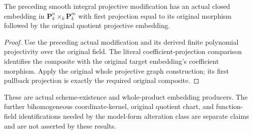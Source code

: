 \begin{theorem}
\label{thm:fc-original-projective-variety-native-resolution-product}
\leanok
{}
The preceding smooth integral projective modification has an actual closed
embedding in $\mathbf P^n_k\times_k\mathbf P^m_k$ with first projection equal
to its original morphism followed by the original quotient projective embedding.
\end{theorem}
\begin{proof}
Use the preceding actual modification and its derived finite polynomial
projectivity over the original field.  The literal coefficient-projection
comparison identifies the composite with the original target embedding's
coefficient morphism.  Apply the original whole projective graph construction;
its first pullback projection is exactly the required original composite.
\end{proof}

\begin{remark}
These are actual scheme-existence and whole-product embedding producers.
The further bihomogeneous coordinate-kernel, original quotient chart, and
function-field identifications needed by the model-form alteration class
are separate claims and are not asserted by these results.
\end{remark}
